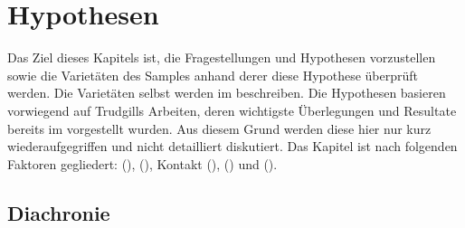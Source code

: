 \section{Hypothesen}\label{3.2}

Das Ziel dieses Kapitels ist, die Fragestellungen und Hypothesen vorzustellen sowie die Varietäten des Samples anhand derer diese Hypothese überprüft werden. Die Varietäten selbst werden im  beschreiben. Die Hypothesen basieren vorwiegend auf Trudgills Arbeiten, deren wichtigste Überlegungen und Resultate bereits im  vorgestellt wurden. Aus diesem Grund werden diese hier nur kurz wiederaufgegriffen und nicht detailliert diskutiert. Das Kapitel ist nach folgenden Faktoren gegliedert:  (),  (), Kontakt (),  () und  ().

\subsection{Diachronie}\label{3.2.1}

